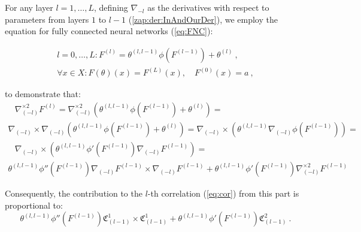 \documentclass{article} %
\begin{document}
For any layer \(l = 1, \ldots, L\), defining \(\nabla_{-l}\) as the derivatives with respect to parameters from layers \(1\) to \(l-1\) (\ref{zap:der:InAndOurDer}), we employ the equation for fully connected neural networks (\ref{eq:FNC}):

\begin{equation}
\begin{array}{c}
l = 0, \ldots, L: F^{(l)} = \theta^{(l,l-1)}\phi\left(F^{(l-1)}\right) + \theta^{(l)}\ , \\
\forall x \in X: F(\theta)\left(x\right) = F^{(L)}\left(x\right),\quad F^{(0)}\left(x\right) = a \ ,
\end{array}
\end{equation}

to demonstrate that:
\begin{equation}
\begin{array}{c}
\begin{array}{c}
\\
\\
\end{array}\nabla_{\left(-l\right)}^{\times2}F^{\left(l\right)}=\nabla_{\left(-l\right)}^{\times2}\left(\theta^{\left(l,l-1\right)}\phi\left(F^{\left(l-1\right)}\right)+\theta^{(l)}\right)=\\
\nabla_{\left(-l\right)}\times\nabla_{\left(-l\right)}\left(\theta^{\left(l,l-1\right)}\phi\left(F^{\left(l-1\right)}\right)+\theta^{(l)}\right)=\nabla_{\left(-l\right)}\times\left(\theta^{\left(l,l-1\right)}\nabla_{\left(-l\right)}\phi\left(F^{\left(l-1\right)}\right)\right)=\\
\begin{array}{c}
\\
\\
\end{array}\nabla_{\left(-l\right)}\times\left(\theta^{\left(l,l-1\right)}\phi'\left(F^{\left(l-1\right)}\right)\nabla_{\left(-l\right)}F^{\left(l-1\right)}\right)=\\
\theta^{\left(l,l-1\right)}\phi''\left(F^{\left(l-1\right)}\right)\nabla_{\left(-l\right)}F^{\left(l-1\right)}\times\nabla_{\left(-l\right)}F^{\left(l-1\right)}+\theta^{\left(l,l-1\right)}\phi'\left(F^{\left(l-1\right)}\right)\nabla_{\left(-l\right)}^{\times2}F^{\left(l-1\right)}
\end{array}
\end{equation}

Consequently, the contribution to the \(l\)-th correlation (\ref{eq:cor}) from this part is proportional to:
\begin{equation}
\theta^{\left(l,l-1\right)}\phi''\left(F^{\left(l-1\right)}\right)\mathfrak{C}_{\left(l-1\right)}^{1}\times\mathfrak{C}_{\left(l-1\right)}^{1}+\theta^{\left(l,l-1\right)}\phi'\left(F^{\left(l-1\right)}\right)\mathfrak{C}_{\left(l-1\right)}^{2} \ .
\end{equation}
\end{document}
